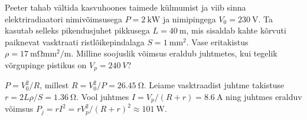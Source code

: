 
Peeter tahab vältida kasvuhoones taimede külmumist ja viib sinna elektriradiaatori nimivõimsusega $P=\qty{2}{\kW}$ ja nimipingega $V_0=\qty{230}{\V}$. Ta kasutab selleks pikendusjuhet pikkusega $L=\qty{40}{\m}$, mis  sisaldab kahte kõrvuti paiknevat vasktraati ristlõikepindalaga $S=\qty{1}{\mm\squared}$. Vase eritakistus $\rho=\qty{17}{\mohm\mm\squared\per\m}$. Milline soojuslik võimsus eraldub juhtmetes, kui tegelik võrgupinge pistikus on $V_p=\qty{240}{V}$?


\hint

\solu
$P=V_0^2/R$, millest $R=V_0^2/P=\qty{26.45}{\ohm}$. Leiame vasktraadist juhtme takistuse $r=2L\rho/S=\qty{1.36}{\ohm}$. Vool juhtmes $I=V_p/(R+r)=\qty{8.6}{\A}$ ning juhtmes eralduv võimsus $P_j=rI^2=rV_p^2/(R+r)^2\approx\qty{101}{\W}$.
\probend